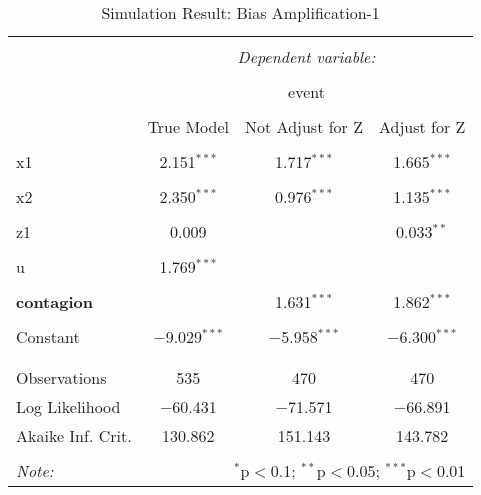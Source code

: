 \documentclass[11pt]{article}
\begin{document}
\begin{table}[!htbp] \centering 
  \caption{Simulation Result: Bias Amplification-1} 
  \label{} 
\begin{tabular}{@{\extracolsep{5pt}}lccc} 
\\[-1.8ex]\hline 
\hline \\[-1.8ex] 
 & \multicolumn{3}{c}{\textit{Dependent variable:}} \\ 
\cline{2-4} 
\\[-1.8ex] & \multicolumn{3}{c}{event} \\ 
\\[-1.8ex] & True Model & Not Adjust for Z & Adjust for Z\\ 
\hline \\[-1.8ex] 
 x1 & 2.151$^{***}$ & 1.717$^{***}$ & 1.665$^{***}$ \\ 
  & & & \\ 
 x2 & 2.350$^{***}$ & 0.976$^{***}$ & 1.135$^{***}$ \\ 
  & & & \\ 
 z1 & 0.009 &  & 0.033$^{**}$ \\ 
  & & & \\ 
 u & 1.769$^{***}$ &  &  \\ 
  & & & \\ 
 \textbf{contagion} &  & 1.631$^{***}$ & 1.862$^{***}$ \\ 
  & & & \\ 
 Constant & $-$9.029$^{***}$ & $-$5.958$^{***}$ & $-$6.300$^{***}$ \\ 
  & & & \\ 
\hline \\[-1.8ex] 
Observations & 535 & 470 & 470 \\ 
Log Likelihood & $-$60.431 & $-$71.571 & $-$66.891 \\ 
Akaike Inf. Crit. & 130.862 & 151.143 & 143.782 \\ 
\hline 
\hline \\[-1.8ex] 
\textit{Note:}  & \multicolumn{3}{r}{$^{*}$p$<$0.1; $^{**}$p$<$0.05; $^{***}$p$<$0.01} \\ 
\end{tabular} 
\end{table} 
\end{document}
